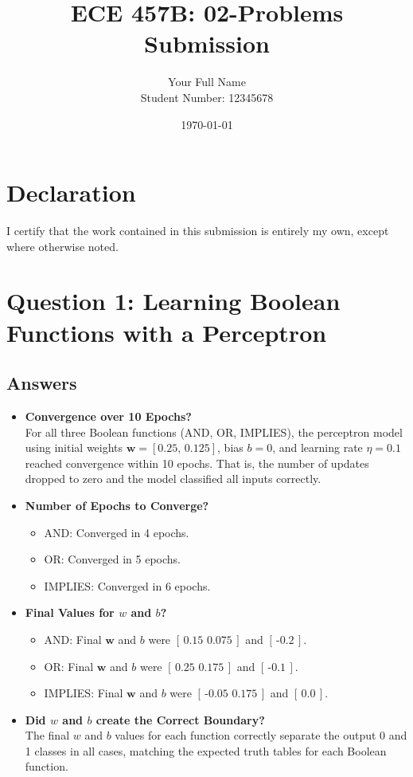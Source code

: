 \documentclass[11pt]{article}
\title{ECE 457B: 02-Problems Submission}
\author{Your Full Name \\ Student Number: 12345678}
\date{\today}
\begin{document}
\maketitle

\section*{Declaration}
I certify that the work contained in this submission is entirely my own, except where otherwise noted.

\newpage

\section{Question 1: Learning Boolean Functions with a Perceptron}
\subsection{Answers}
\begin{itemize}
    \item \textbf{Convergence over 10 Epochs?} \\
    For all three Boolean functions (AND, OR, IMPLIES), the perceptron model using initial weights $\mathbf{w} = [0.25,\,0.125]$, bias $b = 0$, and learning rate $\eta = 0.1$ reached convergence within 10 epochs. That is, the number of updates dropped to zero and the model classified all inputs correctly.

    \item \textbf{Number of Epochs to Converge?} \\
    \begin{itemize}
        \item AND: Converged in 4 epochs.
        \item OR: Converged in 5 epochs.
        \item IMPLIES: Converged in 6 epochs.
    \end{itemize}

    \item \textbf{Final Values for $w$ and $b$?}
    \begin{itemize}
        \item AND: Final $\mathbf{w}$ and $b$ were $[\, \text{0.15 0.075} \,]$ and $[\, \text{-0.2} \,]$.
        \item OR: Final $\mathbf{w}$ and $b$ were $[\, \text{0.25 0.175} \,]$ and $[\, \text{-0.1} \,]$.
        \item IMPLIES: Final $\mathbf{w}$ and $b$ were $[\, \text{-0.05 0.175} \,]$ and $[\, \text{0.0} \,]$.
    \end{itemize}

    \item \textbf{Did $w$ and $b$ create the Correct Boundary?} \\
    The final $w$ and $b$ values for each function correctly separate the output 0 and 1 classes in all cases, matching the expected truth tables for each Boolean function.
\end{itemize}
\end{document}
